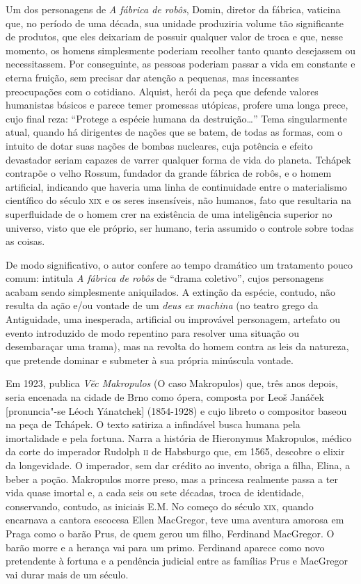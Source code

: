 Um dos personagens de \textit{A fábrica de robôs}, Domin, diretor da fábrica,
vaticina que, no período de uma década, sua unidade produziria volume tão
significante de produtos, que eles deixariam de possuir qualquer valor de troca
e que, nesse momento, os homens simplesmente poderiam recolher tanto quanto
desejassem ou necessitassem. Por conseguinte, as pessoas poderiam passar a vida
em constante e eterna fruição, sem precisar dar atenção a pequenas, mas
incessantes preocupações com o cotidiano. Alquist, herói da peça que defende
valores humanistas básicos e parece temer promessas utópicas, profere uma longa
prece, cujo final reza: “Protege a espécie humana da destruição\ldots{}” Tema 
singularmente atual, quando há dirigentes de nações que se batem, de todas as
formas, com o intuito de dotar suas nações de bombas nucleares, cuja potência e
efeito devastador seriam capazes de varrer qualquer forma de vida do planeta.
Tchápek contrapõe o velho Rossum, fundador da grande fábrica de robôs, e o homem
artificial, indicando que haveria uma linha de continuidade entre o
materialismo científico do século \textsc{xix} e os seres insensíveis, não humanos, fato
que resultaria na superfluidade de o homem crer na existência de uma
inteligência superior no universo, visto que ele próprio, ser humano, teria
assumido o controle sobre todas as coisas.

De modo significativo, o autor confere ao tempo dramático um tratamento
pouco comum:  intitula \textit{A fábrica de robôs} de “drama coletivo”, cujos
personagens acabam sendo simplesmente aniquilados. A extinção da espécie,
contudo, não resulta da ação e/ou vontade de um \textit{deus ex machina} (no teatro
grego da Antiguidade, uma inesperada, artificial ou improvável personagem,
artefato ou evento introduzido de modo repentino para resolver uma situação ou
desembaraçar uma trama), mas na revolta do homem contra as leis da natureza,
que pretende dominar e submeter à sua própria minúscula vontade. 

Em 1923, publica \textit{V\u{e}c Makropulos} (O caso Makropulos) que, três anos
depois, seria encenada na cidade de Brno como ópera, composta por Leoš Janáček
[pronuncia"-se Léoch Yánatchek] (1854-1928) e cujo libreto o compositor baseou
na peça de Tchápek. O texto satiriza a infindável busca humana pela imortalidade
e pela fortuna. Narra a história de Hieronymus Makropulos, médico da corte do
imperador Rudolph \textsc{ii} de Habsburgo que, em 1565, descobre o elixir da
longevidade. O imperador, sem dar crédito ao invento, obriga a filha, Elina, a
beber a poção. Makropulos morre preso, mas a princesa realmente passa a ter
vida quase imortal e, a cada seis ou sete décadas, troca de identidade,
conservando, contudo, as iniciais E.M. No começo do século \textsc{xix}, quando
encarnava a cantora escocesa Ellen MacGregor, teve uma aventura amorosa em
Praga como o barão Prus, de quem gerou um filho, Ferdinand MacGregor. O barão
morre e a herança vai para um primo. Ferdinand aparece como novo pretendente à
fortuna e a pendência judicial entre as famílias Prus e MacGregor vai durar
mais de um século. 

